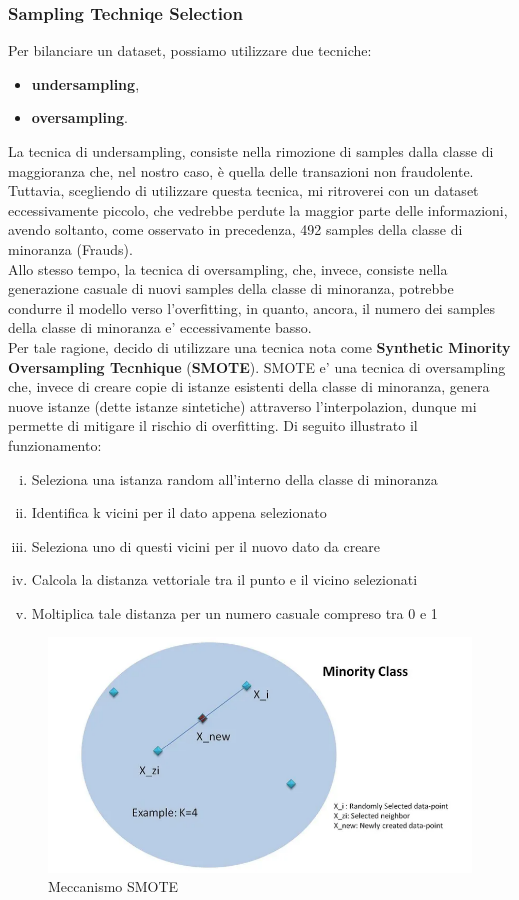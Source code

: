 \documentclass[]{article}
\begin{document}
        \subsubsection{Sampling Techniqe Selection}
            Per bilanciare un dataset, possiamo utilizzare due tecniche:
            \begin{itemize}
                \item \textbf{undersampling},
                \item \textbf{oversampling}.
            \end{itemize}
            La tecnica di undersampling, consiste nella rimozione di samples dalla classe di maggioranza che, nel nostro caso, è quella delle transazioni non fraudolente. Tuttavia, scegliendo di utilizzare questa tecnica, mi ritroverei con un dataset eccessivamente piccolo, che vedrebbe perdute la maggior parte delle informazioni, avendo soltanto, come osservato in precedenza, 492 samples della classe di minoranza (Frauds).\\
            Allo stesso tempo, la tecnica di oversampling, che, invece, consiste nella generazione casuale di nuovi samples della classe di minoranza, potrebbe condurre il modello verso l'overfitting, in quanto, ancora, il numero dei samples della classe di minoranza e' eccessivamente basso.\\
            Per tale ragione, decido di utilizzare una tecnica nota come \textbf{Synthetic Minority Oversampling Tecnhique} (\textbf{SMOTE}).
            SMOTE e' una tecnica di oversampling che, invece di creare copie di istanze esistenti della classe di minoranza, genera nuove istanze (dette istanze sintetiche) attraverso l'interpolazion, dunque mi permette di mitigare il rischio di overfitting. Di seguito illustrato il funzionamento:
            \begin{enumerate}[i.]
                \item Seleziona una istanza random all'interno della classe di minoranza
                \item Identifica k vicini per il dato appena selezionato
                \item Seleziona uno di questi vicini per il nuovo dato da creare
                \item Calcola la distanza vettoriale tra il punto e il vicino selezionati
                \item Moltiplica tale distanza per un numero casuale compreso tra 0 e 1
            \end{enumerate}
            \begin{figure}[H]
                \centering
                \includegraphics[width=.45\textwidth]{img/SMOTE.png}
                \caption[short]{Meccanismo SMOTE}
            \end{figure}
\end{document}
